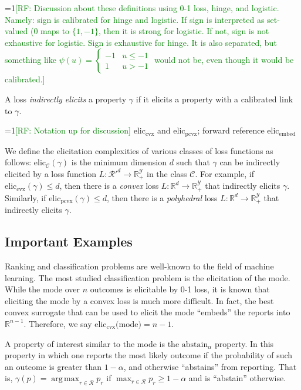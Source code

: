 \documentclass[anon,12pt]{colt2019}
\newcommand{\Comments}{1}
\newcommand{\mynote}[2]{\ifnum\Comments=1\textcolor{#1}{#2}\fi}
\newcommand{\raf}[1]{\mynote{green}{[RF: #1]}}
\newcommand{\reals}{\mathbb{R}}
\newcommand{\eliccvx}{\mathrm{elic}_\mathrm{cvx}}
\newcommand{\elicpoly}{\mathrm{elic}_\mathrm{pcvx}}
\newcommand{\elicembed}{\mathrm{elic}_\mathrm{embed}}
\newcommand{\abstain}[1]{\mathrm{abstain}_{#1}}
\newcommand{\C}{\mathcal{C}}
\newcommand{\R}{\mathcal{R}}
\newcommand{\Y}{\mathcal{Y}}
\DeclareMathOperator*{\argmax}{arg\,max}
\begin{document}
\raf{Discussion about these definitions using 0-1 loss, hinge, and logistic.  Namely: sign is calibrated for hinge and logistic.  If sign is interpreted as set-valued (0 maps to $\{1,-1\}$, then it is strong for logistic.  If not, sign is not exhaustive for logistic.  Sign is exhaustive for hinge.  It is also separated, but something like $\psi(u) =
  \begin{cases}
    -1 & u \leq -1\\
    1 & u > -1
  \end{cases}$
  would not be, even though it would be calibrated.}


\begin{definition}
  A loss \emph{indirectly elicits} a property $\gamma$ if it elicits a property with a calibrated link to $\gamma$.
\end{definition}

\raf{Notation up for discussion}
$\eliccvx$ and $\elicpoly$; forward reference $\elicembed$

We define the elicitation complexities of various classes of loss functions as follows: elic$_\C(\gamma)$ is the minimum dimension $d$ such that $\gamma$ can be indirectly elicited by a loss function $L: \R'^d \to \reals^\Y_+$ in the class $\C$.
For example, if $\eliccvx(\gamma) \leq d$, then there is a \emph{convex} loss $L:\reals^d \to \reals^\Y_+$ that indirectly elicits $\gamma$.
Similarly, if $\elicpoly(\gamma) \leq d$, then there is a \emph{polyhedral} loss $L:\reals^d \to \reals^\Y_+$ that indirectly elicits $\gamma$.

\subsection{Important Examples}
Ranking and classification problems are well-known to the field of machine learning.
The most studied classification problem is the elicitation of the mode.
While the mode over $n$ outcomes is elicitable by 0-1 loss, it is known that eliciting the mode by a convex loss is much more difficult.
In fact, the best convex surrogate that can be used to elicit the mode ``embeds'' the reports into $\reals^{n-1}$.
Therefore, we say $\eliccvx($mode$) = n-1$.

A property of interest similar to the mode is the $\abstain{\alpha}$ property.
In this property in which one reports the most likely outcome if the probability of such an outcome is greater than $1-\alpha$, and otherwise ``abstains'' from reporting.
That is, $\gamma(p) = \argmax_{r \in \R}p_r$ if $\max_{r \in \R} p_r \geq 1-\alpha$ and is ``abstain'' otherwise.
\end{document}
